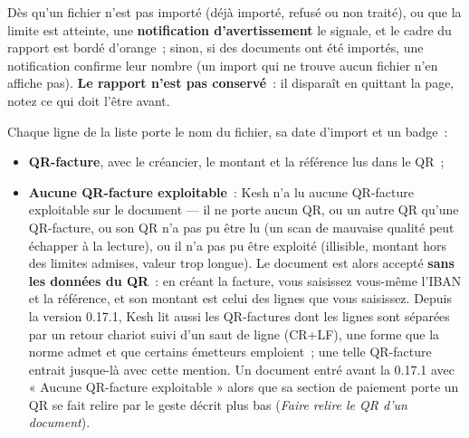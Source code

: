 \documentclass[a4paper,11pt,oneside]{article}
\begin{document}
Dès qu'un fichier n'est pas importé (déjà importé, refusé ou non traité), ou que la
limite est atteinte, une \textbf{notification d'avertissement} le signale, et le cadre du
rapport est bordé d'orange~; sinon, si des documents ont été importés, une notification
confirme leur nombre (un import qui ne trouve aucun fichier n'en affiche pas). \textbf{Le rapport n'est pas
conservé}~: il disparaît en quittant la page, notez ce qui doit l'être avant.

Chaque ligne de la liste porte le nom du fichier, sa date d'import et un badge~:
\begin{itemize}
    \item \textbf{QR-facture}, avec le créancier, le montant et la référence lus dans le QR~;
    \item \textbf{Aucune QR-facture exploitable}~: Kesh n'a lu aucune QR-facture exploitable
          sur le document --- il ne porte aucun QR, ou un autre QR qu'une QR-facture, ou son
          QR n'a pas pu être lu (un scan de mauvaise qualité peut échapper à la lecture), ou
          il n'a pas pu être exploité (illisible, montant hors des limites admises, valeur
          trop longue). Le document est alors accepté \textbf{sans les données du QR}~: en créant la
          facture, vous saisissez vous-même l'IBAN et la référence, et son montant est
          celui des lignes que vous saisissez.
          Depuis la version 0.17.1, Kesh lit aussi les QR-factures dont les lignes sont
          séparées par un retour chariot suivi d'un saut de ligne (CR+LF), une forme que la
          norme admet et que certains émetteurs emploient~; une telle QR-facture entrait
          jusque-là avec cette mention. Un document entré avant la 0.17.1 avec « Aucune
          QR-facture exploitable » alors que sa section de paiement porte un QR se fait
          relire par le geste décrit plus bas (\emph{Faire relire le QR d'un document}).
\end{itemize}
\end{document}
